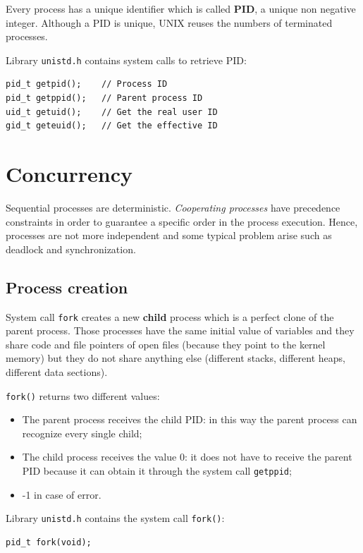 Every process has a unique identifier which is called \textbf{PID}, a unique non negative integer. Although a PID is unique, UNIX reuses the numbers of terminated processes.

Library \texttt{unistd.h} contains system calls to retrieve PID:
\begin{verbatim}
pid_t getpid();    // Process ID
pid_t getppid();   // Parent process ID
uid_t getuid();    // Get the real user ID
gid_t geteuid();   // Get the effective ID
\end{verbatim}
\section{Concurrency}
Sequential processes are deterministic. \textit{Cooperating processes} have precedence constraints in order to guarantee a specific order in the process execution. Hence, processes are not more independent and some typical problem arise such as deadlock and synchronization.

\subsection{Process creation}
System call \texttt{fork} creates a new \textbf{child} process which is a perfect clone of the parent process. Those processes have the same initial value of variables and they share code and file pointers of open files (because they point to the kernel memory) but they do not share anything else (different stacks, different heaps, different data sections).

\texttt{fork()} returns two different values:
\begin{itemize}
\item The parent process receives the child PID: in this way the parent process can recognize every single child;
\item The child process receives the value 0: it does not have to receive the parent PID because it can obtain it through the system call \texttt{getppid};
\item -1 in case of error.
\end{itemize}

Library \texttt{unistd.h} contains the system call \texttt{fork()}:
\begin{verbatim}
pid_t fork(void);
\end{verbatim}

